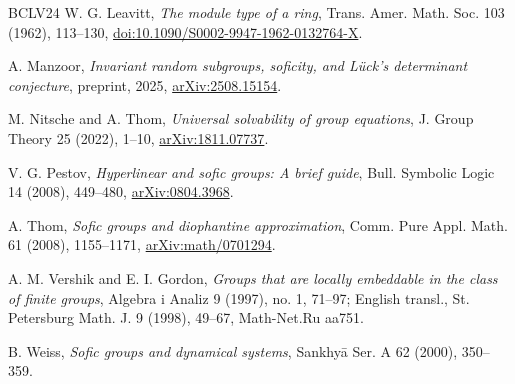 \documentclass[10pt]{article}
\begin{document}
\begin{thebibliography}{BCLV24}
W. G. Leavitt, \emph{The module type of a ring}, Trans. Amer. Math. Soc. 103 (1962), 113--130, \url{doi:10.1090/S0002-9947-1962-0132764-X}.

A. Manzoor, \emph{Invariant random subgroups, soficity, and Lück's determinant conjecture}, preprint, 2025, \url{arXiv:2508.15154}.

M. Nitsche and A. Thom, \emph{Universal solvability of group equations}, J. Group Theory 25 (2022), 1--10, \url{arXiv:1811.07737}.

V. G. Pestov, \emph{Hyperlinear and sofic groups: A brief guide}, Bull. Symbolic Logic 14 (2008), 449--480, \url{arXiv:0804.3968}.

A. Thom, \emph{Sofic groups and diophantine approximation}, Comm. Pure Appl. Math. 61 (2008), 1155--1171, \url{arXiv:math/0701294}.

A. M. Vershik and E. I. Gordon, \emph{Groups that are locally embeddable in the class of finite groups}, Algebra i Analiz 9 (1997), no. 1, 71--97; English transl., St. Petersburg Math. J. 9 (1998), 49--67, Math-Net.Ru aa751.

B. Weiss, \emph{Sofic groups and dynamical systems}, Sankhy\={a} Ser. A 62 (2000), 350--359.

\end{thebibliography}
\end{document}
